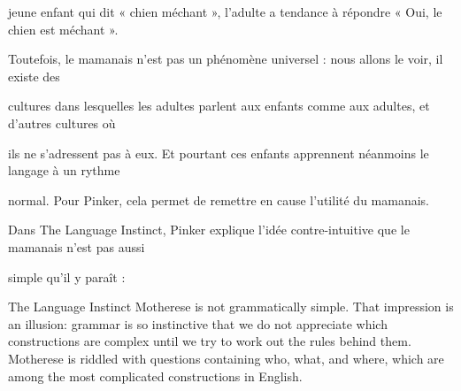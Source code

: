jeune enfant qui dit « chien méchant », l'adulte a tendance à répondre « Oui, le chien est méchant ».

Toutefois, le mamanais n’est pas un phénomène universel : nous allons le voir, il existe des

cultures dans lesquelles les adultes parlent aux enfants comme aux adultes, et d'autres cultures où

ils ne s'adressent pas à eux. Et pourtant ces enfants apprennent néanmoins le langage à un rythme

normal. Pour Pinker, cela permet de remettre en cause l'utilité du mamanais.


Dans The Language Instinct, Pinker explique l'idée contre-intuitive que le mamanais n'est pas aussi

simple qu'il y paraît :
\begin{lecture}{The Language Instinct}
Motherese is not grammatically simple. That impression is an illusion: grammar is so instinctive that we do not appreciate which constructions are complex until we try to work out the rules behind them. Motherese is riddled with questions containing who, what, and where, which are among the most complicated constructions in English.
\end{lecture}


